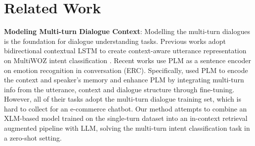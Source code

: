 \section{Related Work}

\textbf{Modeling Multi-turn Dialogue Context}: Modelling the multi-turn dialogues is the foundation for dialogue understanding tasks. Previous works adopt bidirectional contextual LSTM \cite{ghosal2021exploring,liu2022title2vec} to create context-aware utterance representation on MultiWOZ intent classification \cite{budzianowski2018multiwoz}. Recent works use PLM as a sentence encoder \cite{shen2021directed} on emotion recognition in conversation (ERC). Specifically, \cite{lee2022compm} used PLM to encode the context and speaker's memory and \cite{qin2023bert} enhance PLM by integrating multi-turn info from the utterance, context and dialogue structure through fine-tuning. However, all of their tasks adopt the multi-turn dialogue training set, which is hard to collect for an e-commerce chatbot. Our method attempts to combine an XLM-based model trained on the single-turn dataset into an in-context retrieval augmented pipeline with LLM, solving the multi-turn intent classification task in a zero-shot setting. 

